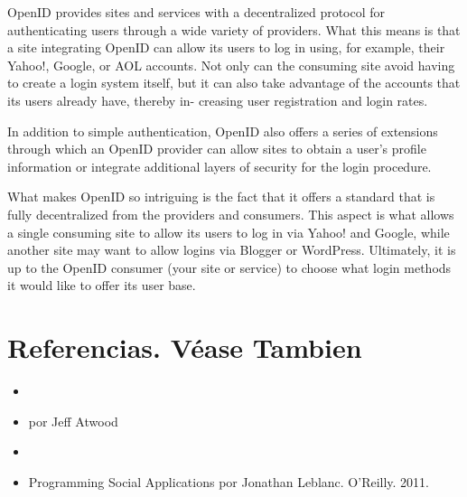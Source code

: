 
OpenID provides sites and services with a decentralized protocol for
authenticating users through a wide variety of providers. What this means
is that a site integrating OpenID can allow its users to log in using,
for example, their Yahoo!, Google, or AOL accounts. Not only can the
consuming site avoid having to create a login system itself, but it
can also take advantage of the accounts that its users already have,
thereby in- creasing user registration and login rates.


In addition to simple authentication, OpenID also offers a series of
extensions through which an OpenID provider can allow sites to obtain
a user’s profile information or integrate additional layers
of security for the login procedure.


What makes OpenID so intriguing is the fact that it offers a standard
that is fully decentralized from the providers and consumers. This
aspect is what allows a single consuming site to allow its
users to log in via Yahoo! and Google, while another site may want to
allow logins via Blogger or WordPress. Ultimately, it is up to the OpenID
consumer (your site or service) to choose what login
methods it would like to offer its user base.

\section{Referencias. Véase Tambien}

\begin{itemize}
\item
{}
\item
{} por  Jeff Atwood
\item
{}
\item
Programming Social Applications por Jonathan Leblanc. O'Reilly. 2011.
\end{itemize}



